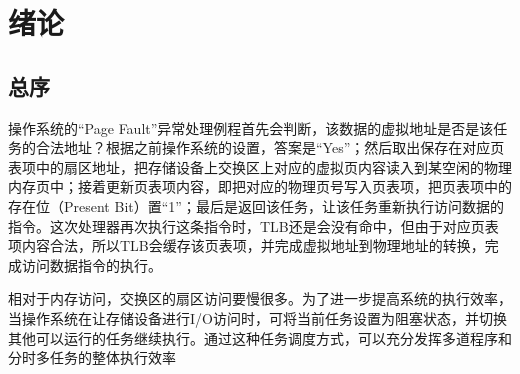 \chapter{绪论}
\label{chap:references}

\section{总序}

操作系统的“Page Fault”异常处理例程首先会判断，该数据的虚拟地址是否是该任务的合法地址？根据之前操作系统的设置，答案是“Yes”；然后取出保存在对应页表项中的扇区地址，把存储设备上交换区上对应的虚拟页内容读入到某空闲的物理内存页中；接着更新页表项内容，即把对应的物理页号写入页表项，把页表项中的存在位（Present Bit）置“1”；最后是返回该任务，让该任务重新执行访问数据的指令。这次处理器再次执行这条指令时，TLB还是会没有命中，但由于对应页表项内容合法，所以TLB会缓存该页表项，并完成虚拟地址到物理地址的转换，完成访问数据指令的执行。

相对于内存访问，交换区的扇区访问要慢很多。为了进一步提高系统的执行效率，当操作系统在让存储设备进行I/O访问时，可将当前任务设置为阻塞状态，并切换其他可以运行的任务继续执行。通过这种任务调度方式，可以充分发挥多道程序和分时多任务的整体执行效率

